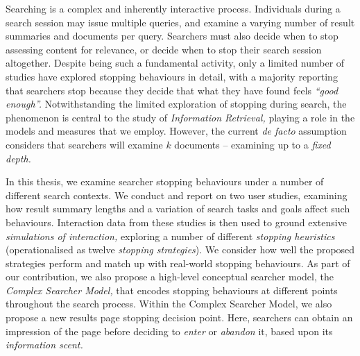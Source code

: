 
\begin{preamble}
{}

Searching is a complex and inherently interactive process. Individuals during a search session may issue multiple queries, and examine a varying number of result summaries and documents per query. Searchers must also decide when to stop assessing content for relevance, or decide when to stop their search session altogether. Despite being such a fundamental activity, only a limited number of studies have explored stopping behaviours in detail, with a majority reporting that searchers stop because they decide that what they have found feels \emph{``good enough''.} Notwithstanding the limited exploration of stopping during search, the phenomenon is central to the study of \emph{Information Retrieval,} playing a role in the models and measures that we employ. However, the current \emph{de facto} assumption considers that searchers will examine $k$ documents -- examining up to a \emph{fixed depth.}

In this thesis, we examine searcher stopping behaviours under a number of different search contexts. We conduct and report on two user studies, examining how result summary lengths and a variation of search tasks and goals affect such behaviours. Interaction data from these studies is then used to ground extensive \emph{simulations of interaction,}  exploring a number of different \emph{stopping heuristics} (operationalised as twelve \emph{stopping strategies}). We consider how well the proposed strategies perform and match up with real-world stopping behaviours. As part of our contribution, we also propose a high-level conceptual searcher model, the \emph{Complex Searcher Model,} that encodes stopping behaviours at different points throughout the search process. Within the Complex Searcher Model, we also propose a new results page stopping decision point. Here, searchers can obtain an impression of the page before deciding to \emph{enter} or \emph{abandon} it, based upon its \emph{information scent.}


\end{preamble}
